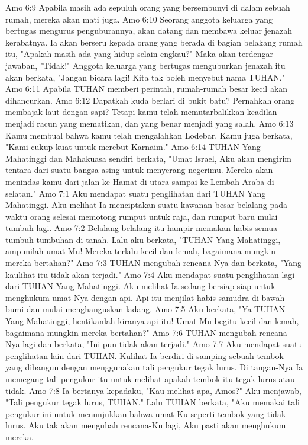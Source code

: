 Amo 6:9  Apabila masih ada sepuluh orang yang bersembunyi di dalam sebuah rumah, mereka akan mati juga.
Amo 6:10  Seorang anggota keluarga yang bertugas mengurus penguburannya, akan datang dan membawa keluar jenazah kerabatnya. Ia akan berseru kepada orang yang berada di bagian belakang rumah itu, "Apakah masih ada yang hidup selain engkau?" Maka akan terdengar jawaban, "Tidak!" Anggota keluarga yang bertugas menguburkan jenazah itu akan berkata, "Jangan bicara lagi! Kita tak boleh menyebut nama TUHAN."
Amo 6:11  Apabila TUHAN memberi perintah, rumah-rumah besar kecil akan dihancurkan.
Amo 6:12  Dapatkah kuda berlari di bukit batu? Pernahkah orang membajak laut dengan sapi? Tetapi kamu telah memutarbalikkan keadilan menjadi racun yang mematikan, dan yang benar menjadi yang salah.
Amo 6:13  Kamu membual bahwa kamu telah mengalahkan Lodebar. Kamu juga berkata, "Kami cukup kuat untuk merebut Karnaim."
Amo 6:14  TUHAN Yang Mahatinggi dan Mahakuasa sendiri berkata, "Umat Israel, Aku akan mengirim tentara dari suatu bangsa asing untuk menyerang negerimu. Mereka akan menindas kamu dari jalan ke Hamat di utara sampai ke Lembah Araba di selatan."
Amo 7:1  Aku mendapat suatu penglihatan dari TUHAN Yang Mahatinggi. Aku melihat Ia menciptakan suatu kawanan besar belalang pada waktu orang selesai memotong rumput untuk raja, dan rumput baru mulai tumbuh lagi.
Amo 7:2  Belalang-belalang itu hampir memakan habis semua tumbuh-tumbuhan di tanah. Lalu aku berkata, "TUHAN Yang Mahatinggi, ampunilah umat-Mu! Mereka terlalu kecil dan lemah, bagaimana mungkin mereka bertahan?"
Amo 7:3  TUHAN mengubah rencana-Nya dan berkata, "Yang kaulihat itu tidak akan terjadi."
Amo 7:4  Aku mendapat suatu penglihatan lagi dari TUHAN Yang Mahatinggi. Aku melihat Ia sedang bersiap-siap untuk menghukum umat-Nya dengan api. Api itu menjilat habis samudra di bawah bumi dan mulai menghanguskan ladang.
Amo 7:5  Aku berkata, "Ya TUHAN Yang Mahatinggi, hentikanlah kiranya api itu! Umat-Mu begitu kecil dan lemah, bagaimana mungkin mereka bertahan?"
Amo 7:6  TUHAN mengubah rencana-Nya lagi dan berkata, "Ini pun tidak akan terjadi."
Amo 7:7  Aku mendapat suatu penglihatan lain dari TUHAN. Kulihat Ia berdiri di samping sebuah tembok yang dibangun dengan menggunakan tali pengukur tegak lurus. Di tangan-Nya Ia memegang tali pengukur itu untuk melihat apakah tembok itu tegak lurus atau tidak.
Amo 7:8  Ia bertanya kepadaku, "Kau melihat apa, Amos?" Aku menjawab, "Tali pengukur tegak lurus, TUHAN." Lalu TUHAN berkata, "Aku memakai tali pengukur ini untuk menunjukkan bahwa umat-Ku seperti tembok yang tidak lurus. Aku tak akan mengubah rencana-Ku lagi, Aku pasti akan menghukum mereka.
